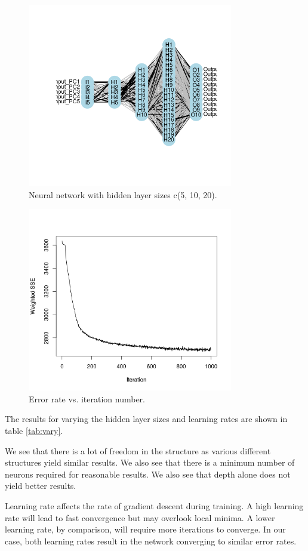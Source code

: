\documentclass[paper=a4, fontsize=11pt]{scrartcl} %
\begin{document}
	\begin{figure}[h]
		\centering
		\includegraphics[width=0.8\textwidth]{nn.png}
		\caption{Neural network with hidden layer sizes c(5, 10, 20).}
		\label{fig:nn}
	\end{figure}

	\begin{figure}[h]
		\centering
		\includegraphics[width=0.8\textwidth]{iterr.png}
		\caption{Error rate vs. iteration number.}
		\label{fig:iterr}
	\end{figure}

	\newpage
	The results for varying the hidden layer sizes and learning rates are shown in table \ref{tab:vary}. \par
	We see that there is a lot of freedom in the structure as various different structures yield similar results. We also see that there is a minimum number of neurons required for reasonable results. We also see that depth alone does not yield better results.\par
	Learning rate affects the rate of gradient descent during training. A high learning rate will lead to fast convergence but may overlook local minima. A lower learning rate, by comparison, will require more iterations to converge. In our case, both learning rates result in the network converging to similar error rates.
\end{document}
